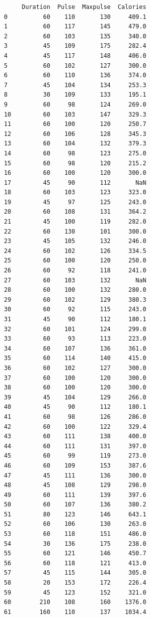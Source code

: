 \begin{code}
\begin{verbatim}
     Duration  Pulse  Maxpulse  Calories
0          60    110       130     409.1
1          60    117       145     479.0
2          60    103       135     340.0
3          45    109       175     282.4
4          45    117       148     406.0
5          60    102       127     300.0
6          60    110       136     374.0
7          45    104       134     253.3
8          30    109       133     195.1
9          60     98       124     269.0
10         60    103       147     329.3
11         60    100       120     250.7
12         60    106       128     345.3
13         60    104       132     379.3
14         60     98       123     275.0
15         60     98       120     215.2
16         60    100       120     300.0
17         45     90       112       NaN
18         60    103       123     323.0
19         45     97       125     243.0
20         60    108       131     364.2
21         45    100       119     282.0
22         60    130       101     300.0
23         45    105       132     246.0
24         60    102       126     334.5
25         60    100       120     250.0
26         60     92       118     241.0
27         60    103       132       NaN
28         60    100       132     280.0
29         60    102       129     380.3
30         60     92       115     243.0
31         45     90       112     180.1
32         60    101       124     299.0
33         60     93       113     223.0
34         60    107       136     361.0
35         60    114       140     415.0
36         60    102       127     300.0
37         60    100       120     300.0
38         60    100       120     300.0
39         45    104       129     266.0
40         45     90       112     180.1
41         60     98       126     286.0
42         60    100       122     329.4
43         60    111       138     400.0
44         60    111       131     397.0
45         60     99       119     273.0
46         60    109       153     387.6
47         45    111       136     300.0
48         45    108       129     298.0
49         60    111       139     397.6
50         60    107       136     380.2
51         80    123       146     643.1
52         60    106       130     263.0
53         60    118       151     486.0
54         30    136       175     238.0
55         60    121       146     450.7
56         60    118       121     413.0
57         45    115       144     305.0
58         20    153       172     226.4
59         45    123       152     321.0
60        210    108       160    1376.0
61        160    110       137    1034.4

\end{verbatim}
\end{code}
